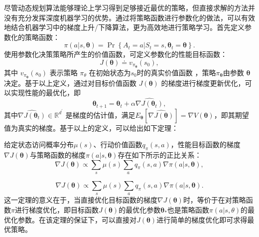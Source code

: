 尽管动态规划算法能够理论上学习得到足够接近最优的策略，但直接求解的方法并没有充分发挥深度机器学习的优势。通过将策略函数进行参数化的做法，可以有效地结合机器学习中的梯度上升/下降算法，更为高效地进行策略学习\cite{sutton1999policy,grondman2012survey}。首先定义参数化的策略函数：
\begin{equation}
\pi ( a | s , \boldsymbol { \theta } ) = \operatorname { Pr } \left\{ A _ { t } = a | S _ { t } = s , \boldsymbol { \theta } _ { t } = \boldsymbol { \theta } \right\}.
\end{equation}
使用参数化决策策略所产生的价值函数，可定义参数化的性能目标函数：
\begin{equation}
    J(\boldsymbol{\theta}) \doteq v_{\pi_{\boldsymbol{\theta}}}\left(s_{0}\right),
\end{equation}
其中 $v_{\pi_{\boldsymbol{\theta}}}\left(s_{0}\right)$ 表示策略 $\pi_\theta$ 在初始状态为$s_0$时的真实价值函数 ，策略$\pi_{\boldsymbol{\theta}}$由参数 $\boldsymbol{\theta}$ 决定。基于以上定义，通过对目标价值函数 $J ( \boldsymbol { \theta } )$ 的梯度进行梯度更新优化，可以实现性能的最优化，即
\begin{equation}
\boldsymbol { \theta } _ { t + 1 } = \boldsymbol { \theta } _ { t } + \alpha \widehat { \nabla J \left( \boldsymbol { \theta } _ { t } \right) },
\end{equation}
其中$\widehat { \nabla J \left( \boldsymbol { \theta } _ { t } \right) } \in \mathbb { R } ^ { d ^ { \prime } }$ 是梯度的估计值，满足$E_\boldsymbol{\theta}\left[\widehat { \nabla J \left( \boldsymbol { \theta } \right) }\right]=\nabla V(\boldsymbol{\theta})$，即其期望值为真实的梯度。基于以上的定义，可以给出如下定理：
\begin{theorem}
给定状态访问概率分布$\mu(s)$、行动价值函数$q_\pi(s,a)$，性能目标函数的梯度$\nabla J(\boldsymbol{\theta})$与策略函数的梯度$\pi(a | s, \boldsymbol{\theta})$存在如下所示的正比关系：
\begin{equation}
    \nabla J(\boldsymbol{\theta}) \propto \sum_{s} \mu(s) \sum_{a} q_{\pi}(s, a) \nabla \pi(a | s, \boldsymbol{\theta}),
\end{equation}
\end{theorem}
\begin{equation}
    \nabla J(\boldsymbol{\theta}) \propto \sum_{s} \mu(s) \sum_{a} q_{\pi}(s, a) \nabla \pi(a | s, \boldsymbol{\theta}).
\end{equation}
这一定理的意义在于，当直接优化目标函数的梯度$\nabla J(\boldsymbol{\theta})$时，等价于在对策略函数$\pi$进行梯度优化，即目标函数$J(\boldsymbol{\theta})$的最优化参数$\boldsymbol{\theta_*}$也是策略函数$\pi(a|s,\theta)$的最优化参数。在该定理的保证下，可以直接对$J(\boldsymbol{\theta})$进行简单的梯度优化即可求得最优策略。

